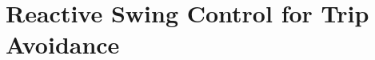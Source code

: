 \chapter{Reactive Swing Control for Trip Avoidance}\label{sec:trip_avoidance}

\graphicspath{{chapters/trip_avoidance/figures/}}










